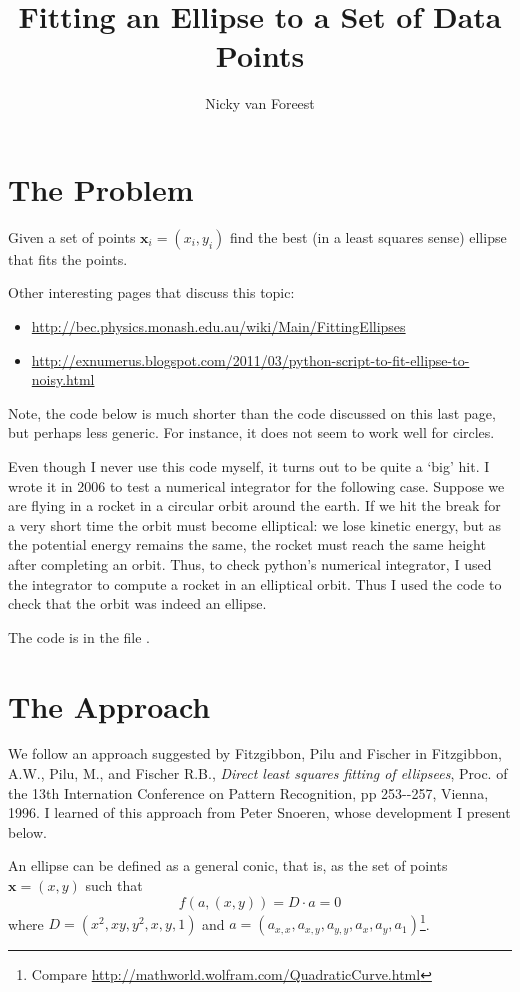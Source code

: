 \documentclass[a4paper,11pt]{article}
\title{Fitting an Ellipse to a Set of Data Points}
\author{Nicky van Foreest}
\date{}
\begin{document}
\maketitle


\section{The Problem}

Given a set of points $\mathbf{x}_i = (x_i,y_i)$ find the best (in a least squares sense) ellipse that fits the points.

Other interesting pages that discuss this topic:
\begin{itemize}
\item \url{http://bec.physics.monash.edu.au/wiki/Main/FittingEllipses}
\item \url{http://exnumerus.blogspot.com/2011/03/python-script-to-fit-ellipse-to-noisy.html}
\end{itemize}
Note, the code below is much shorter than the code discussed on this last page, but perhaps less generic.
For instance, it does not seem to work well for circles.

Even though I never use this code myself, it turns out to be quite a `big' hit.
I wrote it in 2006 to test a numerical integrator for the following case.
Suppose we are flying in a rocket in a circular orbit around the earth.
If we hit the break for a very short time the orbit must become elliptical: we lose kinetic energy, but as the potential energy remains the same, the rocket must reach the same height after completing an orbit.
Thus, to check python's numerical integrator, I used the integrator to compute a rocket in an elliptical orbit.
Thus I used the code to check that the orbit was indeed an ellipse.

The code is in the file .

\section{The Approach}

We follow an approach suggested by Fitzgibbon, Pilu and Fischer in Fitzgibbon, A.W., Pilu, M., and Fischer R.B., \emph{Direct least squares fitting of ellipsees}, Proc.
of the 13th Internation Conference on Pattern Recognition, pp 253-{}-257, Vienna, 1996.
I learned of this approach from Peter Snoeren, whose development I present below.

An ellipse can be defined as a general conic, that is, as the set of points $\mathbf{x} = (x,y)$ such that
\begin{equation}\label{eq:1}
f(a, (x,y)) = D\cdot a = 0
\end{equation}
where  $D = (x^2, xy, y^2, x, y, 1)$ and $a = (a_{x,x}, a_{x,y}, a_{y,y}, a_x, a_y, a_1)$\footnote{Compare \url{http://mathworld.wolfram.com/QuadraticCurve.html}}.
\end{document}
